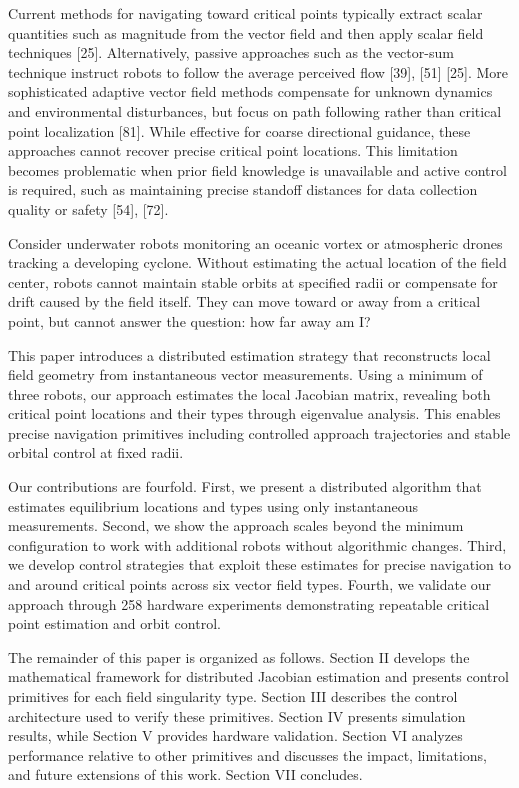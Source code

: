 \documentclass[lettersize,journal]{IEEEtran}
\begin{document}
Current methods for navigating toward critical points typically extract scalar quantities such as magnitude from the vector field and then apply scalar field techniques [25]. Alternatively, passive approaches such as the vector-sum technique instruct robots to follow the average perceived flow [39], [51] [25]. More sophisticated adaptive vector field methods compensate for unknown dynamics and environmental disturbances, but focus on path following rather than critical point localization [81]. While effective for coarse directional guidance, these approaches cannot recover precise critical point locations. This limitation becomes problematic when prior field knowledge is unavailable and active control is required, such as maintaining precise standoff distances for data collection quality or safety [54], [72]. 

Consider underwater robots monitoring an oceanic vortex or atmospheric drones tracking a developing cyclone. Without estimating the actual location of the field center, robots cannot maintain stable orbits at specified radii or compensate for drift caused by the field itself. They can move toward or away from a critical point, but cannot answer the question: how far away am I?

This paper introduces a distributed estimation strategy that reconstructs local field geometry from instantaneous vector measurements. Using a minimum of three robots, our approach estimates the local Jacobian matrix, revealing both critical point locations and their types through eigenvalue analysis. This enables precise navigation primitives including controlled approach trajectories and stable orbital control at fixed radii.

Our contributions are fourfold. First, we present a distributed algorithm that estimates equilibrium locations and types using only instantaneous measurements. Second, we show the approach scales beyond the minimum configuration to work with additional robots without algorithmic changes. Third, we develop control strategies that exploit these estimates for precise navigation to and around critical points across six vector field types. Fourth, we validate our approach through 258 hardware experiments demonstrating repeatable critical point estimation and orbit control.

The remainder of this paper is organized as follows. Section II develops the mathematical framework for distributed Jacobian estimation and presents control primitives for each field singularity type. Section III describes the control architecture used to verify these primitives. Section IV presents simulation results, while Section V provides hardware validation. Section VI analyzes performance relative to other primitives and discusses the impact, limitations, and future extensions of this work. Section VII concludes.
\end{document}
